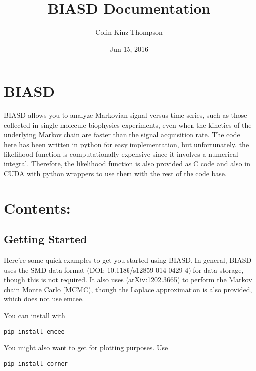 \documentclass[letterpaper,10pt,english]{sphinxmanual}
\title{BIASD Documentation}
\date{Jun 15, 2016}
\author{Colin Kinz-Thompson}
\begin{document}
\maketitle
\tableofcontents
{}\label{index::doc}



\chapter{BIASD}
\label{index:bayesian-inference-for-the-analysis-of-sub-temporal-resolution-data}\label{index:biasd}
BIASD allows you to analyze Markovian signal versus time series, such as those collected in single-molecule biophysics experiments, even when the kinetics of the underlying Markov chain are faster than the signal acquisition rate. The code here has been written in python for easy implementation, but unfortunately, the likelihood function is computationally expensive since it involves a numerical integral. Therefore, the likelihood function is also provided as C code and also in CUDA with python wrappers to use them with the rest of the code base.


\chapter{Contents:}
\label{index:contents}

\section{Getting Started}
\label{getstarted:getstarted}\label{getstarted:getting-started}\label{getstarted::doc}
Here're some quick examples to get you started using BIASD. In general, BIASD uses the SMD data format (DOI: 10.1186/s12859-014-0429-4) for data storage, though this is not required. It also uses  (arXiv:1202.3665) to perform the Markov chain Monte Carlo (MCMC), though the Laplace approximation is also provided, which does not use emcee.

You can install  with

\begin{Verbatim}[commandchars=\\\{\}]
pip install emcee
\end{Verbatim}

You might also want to get  for plotting purposes. Use

\begin{Verbatim}[commandchars=\\\{\}]
pip install corner
\end{Verbatim}
\end{document}
